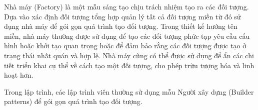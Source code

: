 Nhà máy (Factory)  là một mẫu sáng tạo chịu trách nhiệm tạo ra các đối tượng.    Dựa vào xác định đối tượng tổng hợp quản lý tất cả đối tượng miền từ đó  sử dụng  nhà máy  để   gói gọn quá trình tạo đối tượng.    Trong  thiết kế hướng tên miền,   nhà máy thường được sử dụng để tạo các đối tượng phức tạp yêu cầu cấu hình hoặc khởi tạo quan trọng hoặc để đảm bảo rằng các đối tượng được tạo ở trạng thái nhất quán và hợp lệ. Nhà máy cũng có thể được sử dụng để ẩn các chi tiết triển khai cụ thể về cách tạo một đối tượng, cho phép trừu tượng hóa và linh hoạt hơn.



\begin{example} Trong lập trình,  các lập trình viên thường sử dụng mẫu  Người xây dựng (Builder patterns) để gói gọn quá trình tạo đối tượng.  
    
\end{example}











